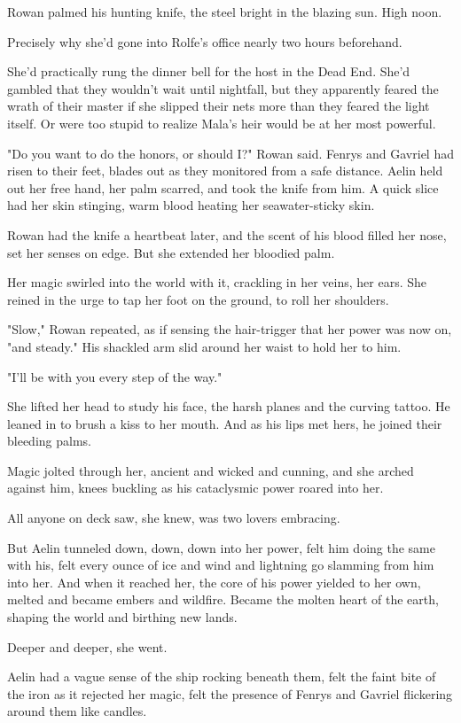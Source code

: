 Rowan palmed his hunting knife, the steel bright in the blazing sun. High noon.

Precisely why she'd gone into Rolfe's office nearly two hours beforehand.

She'd practically rung the dinner bell for the host in the Dead End. She'd gambled that they wouldn't wait until nightfall, but they apparently feared the wrath of their master if she slipped their nets more than they feared the light itself. Or were too stupid to realize Mala's heir would be at her most powerful.

"Do you want to do the honors, or should I?" Rowan said. Fenrys and Gavriel had risen to their feet, blades out as they monitored from a safe distance. Aelin held out her free hand, her palm scarred, and took the knife from him. A quick slice had her skin stinging, warm blood heating her seawater-sticky skin.

Rowan had the knife a heartbeat later, and the scent of his blood filled her nose, set her senses on edge. But she extended her bloodied palm.

Her magic swirled into the world with it, crackling in her veins, her ears. She reined in the urge to tap her foot on the ground, to roll her shoulders.

"Slow," Rowan repeated, as if sensing the hair-trigger that her power was now on, "and steady." His shackled arm slid around her waist to hold her to him.

"I'll be with you every step of the way."

She lifted her head to study his face, the harsh planes and the curving tattoo. He leaned in to brush a kiss to her mouth. And as his lips met hers, he joined their bleeding palms.

Magic jolted through her, ancient and wicked and cunning, and she arched against him, knees buckling as his cataclysmic power roared into her.

All anyone on deck saw, she knew, was two lovers embracing.

But Aelin tunneled down, down, down into her power, felt him doing the same with his, felt every ounce of ice and wind and lightning go slamming from him into her. And when it reached her, the core of his power yielded to her own, melted and became embers and wildfire. Became the molten heart of the earth, shaping the world and birthing new lands.

Deeper and deeper, she went.

Aelin had a vague sense of the ship rocking beneath them, felt the faint bite of the iron as it rejected her magic, felt the presence of Fenrys and Gavriel flickering around them like candles.

